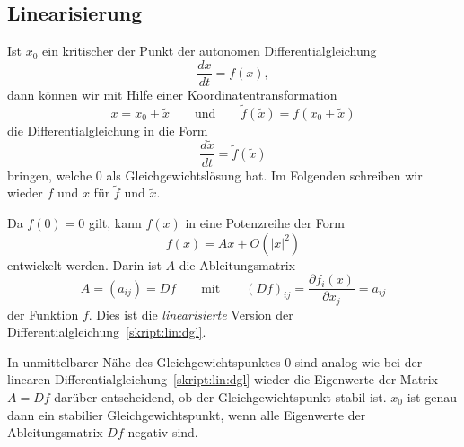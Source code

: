 \subsection{Linearisierung\label{subsection:linearisierung}}
Ist $x_0$ ein kritischer der Punkt der autonomen Differentialgleichung
\[
\frac{dx}{dt} = f(x),
\]
dann können wir mit Hilfe einer Koordinatentransformation
\[
x = x_0 + \tilde x
\qquad
\text{und}
\qquad
\tilde f(\tilde x) = f(x_0 + \tilde x)
\]
die Differentialgleichung in die Form
\[
\frac{d\tilde x}{dt}
=
\tilde f(\tilde x)
\]
bringen, welche $0$ als Gleichgewichtslösung hat.
Im Folgenden schreiben wir wieder $f$ und $x$ für $\tilde f$ und $\tilde x$.

Da $f(0)=0$ gilt, kann $f(x)$ in eine Potenzreihe der Form
\[
f(x) = Ax + O(|x|^2)
\]
entwickelt werden.
Darin ist $A$ die Ableitungsmatrix
\[
A=(a_{ij})=Df
\qquad\text{mit}\qquad
(Df)_{ij}
=
\frac{\partial f_i(x)}{\partial x_j} = a_{ij}
\]
der Funktion $f$.
Dies ist die {\em linearisierte} Version der
%
Differentialgleichung~\eqref{skript:lin:dgl}.

In unmittelbarer Nähe des Gleichgewichtspunktes $0$ sind analog wie
bei der linearen Differentialgleichung~\eqref{skript:lin:dgl}
wieder die Eigenwerte der Matrix $A=Df$ darüber entscheidend, ob der
Gleichgewichtspunkt stabil ist.
$x_0$ ist genau dann ein stabilier Gleichgewichtspunkt, wenn alle
Eigenwerte der Ableitungsmatrix $Df$ negativ sind.








